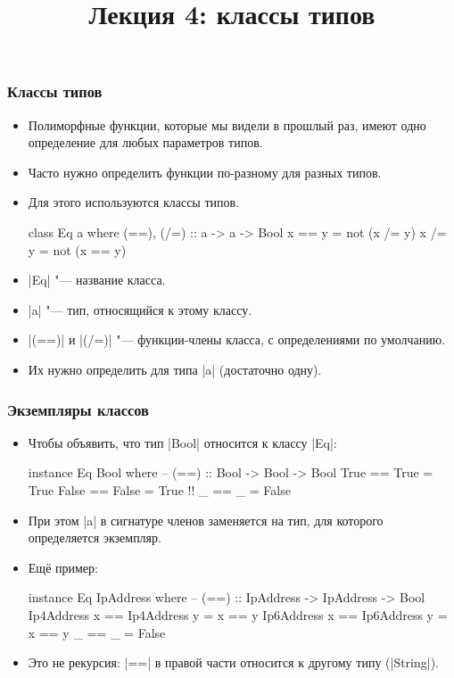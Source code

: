 \documentclass[10pt]{beamer}
\title{Лекция 4: классы типов}
\begin{document}
\begin{frame}[plain]
  \maketitle
\end{frame}

\begin{frame}[fragile]
  \frametitle{Классы типов}
  \begin{itemize}
    \item Полиморфные функции, которые мы видели в прошлый раз, имеют одно определение для любых параметров типов.
    \item Часто нужно определить функции по-разному для разных типов.
    \item Для этого используются классы типов.
          \begin{haskell}
            class Eq a where
                (==), (/=) :: a -> a -> Bool
                x == y = not (x /= y)
                x /= y = not (x == y)
          \end{haskell}
    \item \haskinline|Eq| "--- название класса.
    \item \haskinline|a| "--- тип, относящийся к этому классу.
    \item \haskinline|(==)| и \haskinline|(/=)| "--- функции-члены класса, с определениями по умолчанию.
    \item Их нужно определить для типа \haskinline|a| \pause(достаточно одну).
  \end{itemize}
\end{frame}

\begin{frame}[fragile]
  \frametitle{Экземпляры классов}
  \begin{itemize}
    \item Чтобы объявить, что тип \haskinline|Bool| относится к классу \haskinline|Eq|:
          \begin{haskell}
            instance Eq Bool where
                -- (==) :: Bool -> Bool -> Bool
                True == True = True
                False == False = True !\pause!
                _ == _ = False
          \end{haskell}
    \item При этом \haskinline|a| в сигнатуре членов заменяется на тип, для которого определяется экземпляр.
    \item Ещё пример:\pause
          \begin{haskell}
            instance Eq IpAddress where
                -- (==) :: IpAddress -> IpAddress -> Bool
                Ip4Address x == Ip4Address y = x == y
                Ip6Address x == Ip6Address y = x == y
                _ == _ = False
          \end{haskell}
    \item<4-> Это не рекурсия: \haskinline|==| в правой части относится к другому типу (\haskinline|String|).
  \end{itemize}
\end{frame}
\end{document}
